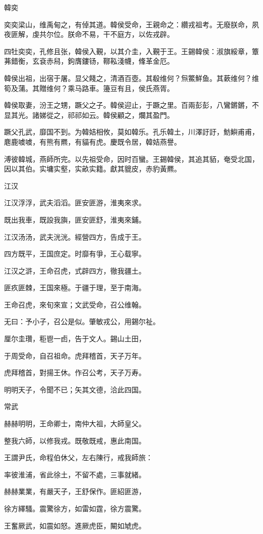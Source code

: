 韓奕

奕奕梁山，维禹甸之，有倬其道。韓侯受命，王親命之：纘戎祖考。无廢朕命，夙夜匪解，虔共尔位。朕命不易，干不庭方，以佐戎辟。

四牡奕奕，孔修且张，韓侯入覲，以其介圭，入覲于王。王錫韓侯：淑旗綏章，簟茀錯衡，玄袞赤舄，鉤膺鏤钖，鞹鞃淺幭，鞗革金厄。

韓侯出祖，出宿于屠。显父餞之，清酒百壺。其殽维何？炰鱉鮮鱼。其蔌维何？维筍及蒲。其贈维何？乘马路車。籩豆有且，侯氏燕胥。

韓侯取妻，汾王之甥，蹶父之子。韓侯迎止，于蹶之里。百兩彭彭，八鸞鏘鏘，不显其光。諸娣從之，祁祁如云。韓侯顧之，爛其盈門。

蹶父孔武，靡国不到。为韓姞相攸，莫如韓乐。孔乐韓土，川澤訏訏，魴鱮甫甫，麀鹿噳噳，有熊有羆，有貓有虎。慶既令居，韓姞燕譽。

溥彼韓城，燕師所完。以先祖受命，因时百蠻。王錫韓侯，其追其貊，奄受北国，因以其伯。实墉实壑，实畝实籍。獻其貔皮，赤豹黃羆。

江汉

江汉浮浮，武夫滔滔。匪安匪游，淮夷來求。

既出我車，既設我旟，匪安匪舒，淮夷來鋪。

江汉汤汤，武夫洸洸。經營四方，告成于王。

四方既平，王国庶定。时靡有爭，王心载寧。

江汉之滸，王命召虎，式辟四方，徹我疆土。

匪疚匪棘，王国來極。于疆于理，至于南海。

王命召虎，來旬來宣；文武受命，召公维翰。

无曰：予小子，召公是似。肇敏戎公，用錫尔祉。

厘尔圭瓚，秬鬯一卣，告于文人。錫山土田，

于周受命，自召祖命。虎拜稽首，天子万年。

虎拜稽首，對揚王休。作召公考，天子万寿。

明明天子，令聞不已；矢其文德，洽此四国。

常武

赫赫明明，王命卿士，南仲大祖，大師皇父。

整我六師，以修我戎。既敬既戒，惠此南国。

王謂尹氏，命程伯休父，左右陳行，戒我師旅：

率彼淮浦，省此徐土，不留不處，三事就緒。

赫赫業業，有嚴天子，王舒保作。匪紹匪游，

徐方繹騷。震驚徐方，如雷如霆，徐方震驚。

王奮厥武，如震如怒。進厥虎臣，闞如虓虎。

